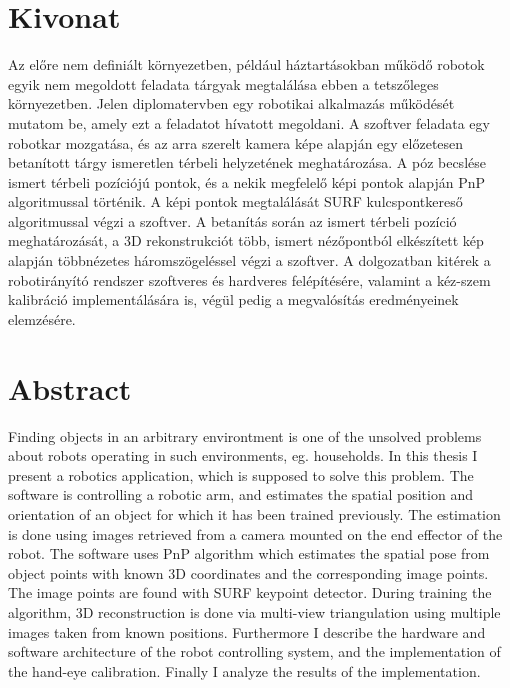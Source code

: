 \chapter*{Kivonat}

Az előre nem definiált környezetben, például háztartásokban működő robotok egyik nem megoldott feladata tárgyak megtalálása ebben a tetszőleges környezetben. Jelen diplomatervben egy robotikai alkalmazás működését mutatom be, amely ezt a feladatot hívatott megoldani. A szoftver feladata egy robotkar mozgatása, és az arra szerelt kamera képe alapján egy előzetesen betanított tárgy ismeretlen térbeli helyzetének meghatározása. A póz becslése ismert térbeli pozíciójú pontok, és a nekik megfelelő képi pontok alapján PnP algoritmussal történik. A képi pontok megtalálását SURF kulcspontkereső algoritmussal végzi a szoftver. A betanítás során az ismert térbeli pozíció meghatározását, a 3D rekonstrukciót több, ismert nézőpontból elkészített kép alapján többnézetes háromszögeléssel végzi a szoftver. A dolgozatban kitérek a robotirányító rendszer szoftveres és hardveres felépítésére, valamint a kéz-szem kalibráció implementálására is, végül pedig a megvalósítás eredményeinek elemzésére.
\vfill

\chapter*{Abstract}

Finding objects in an arbitrary environtment is one of the unsolved problems about robots operating in such environments, eg. households. In this thesis I present a robotics application, which is supposed to solve this problem. The software is controlling a robotic arm, and estimates the spatial position and orientation of 
an object for which it has been trained previously. The estimation is done using images retrieved from a camera mounted on the end effector of the robot. The software uses PnP algorithm which estimates the spatial pose from object points with known 3D coordinates and the corresponding image points. The image points are found with SURF keypoint detector. During training the algorithm, 3D reconstruction is done via multi-view triangulation using multiple images taken from known positions. Furthermore I describe the hardware and software architecture of the robot controlling system, and the implementation of the hand-eye calibration. Finally I analyze the results of the implementation.
\vfill

